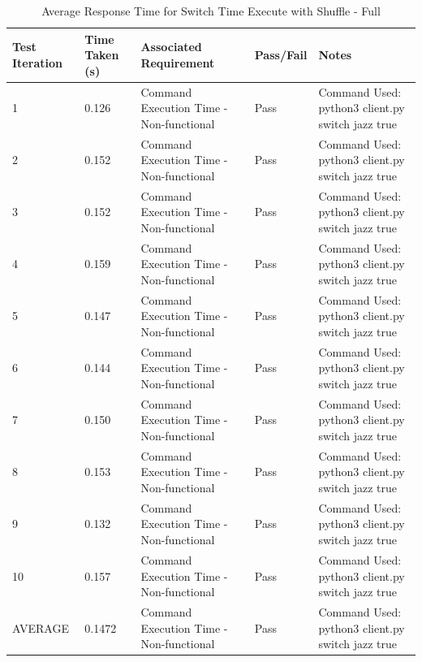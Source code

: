 \begin{table}[H]
  \centering
  \caption{Average Response Time for Switch Time Execute with Shuffle - Full}
  \label{tab:avgResTimeFullSwTES}
  \begin{tabularx}{\linewidth}{XlXlX}
    \toprule
    Test Iteration & Time Taken (s) & Associated Requirement & Pass/Fail & Notes \\
    \midrule
    1  & 0.126 & Command Execution Time - Non-functional & Pass & Command Used: python3 client.py switch jazz true \\
    2  & 0.152 & Command Execution Time - Non-functional & Pass & Command Used: python3 client.py switch jazz true \\
    3  & 0.152 & Command Execution Time - Non-functional & Pass & Command Used: python3 client.py switch jazz true \\
    4  & 0.159 & Command Execution Time - Non-functional & Pass & Command Used: python3 client.py switch jazz true \\
    5  & 0.147 & Command Execution Time - Non-functional & Pass & Command Used: python3 client.py switch jazz true \\
    6  & 0.144 & Command Execution Time - Non-functional & Pass & Command Used: python3 client.py switch jazz true \\
    7  & 0.150 & Command Execution Time - Non-functional & Pass & Command Used: python3 client.py switch jazz true \\
    8  & 0.153 & Command Execution Time - Non-functional & Pass & Command Used: python3 client.py switch jazz true \\
    9  & 0.132 & Command Execution Time - Non-functional & Pass & Command Used: python3 client.py switch jazz true \\
    10 & 0.157 & Command Execution Time - Non-functional & Pass & Command Used: python3 client.py switch jazz true \\
    \bottomrule
    AVERAGE & 0.1472 & Command Execution Time - Non-functional & Pass & Command Used: python3 client.py switch jazz true \\
  \end{tabularx}
\end{table}
 
